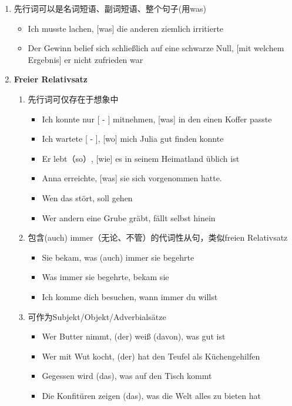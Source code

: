 \documentclass[UTF8]{report}
\begin{document}
\begin{enumerate}
    \item 先行词可以是名词短语、副词短语、整个句子(用was)
    \begin{itemize}
        \item Ich musste lachen, [was] die anderen ziemlich irritierte
        \item Der Gewinn belief sich schließlich auf eine schwarze Null, [mit welchem Ergebnis] er nicht zufrieden war
    \end{itemize}
    \item \textbf{Freier Relativsatz}
    \begin{enumerate}
        \item 先行词可仅存在于想象中
        \begin{itemize}
            \item Ich konnte nur [ - ] mitnehmen, [was] in den einen Koffer passte
            \item Ich wartete [ - ], [wo] mich Julia gut finden konnte
            \item Er lebt（so）, [wie] es in seinem Heimatland üblich ist
            \item Anna erreichte, [was] sie sich vorgenommen hatte.
            \item Wen das stört, soll gehen
            \item Wer andern eine Grube gräbt, fällt selbst hinein
        \end{itemize}
        \item 包含(auch) immer（无论、不管）的代词性从句，类似freien Relativsatz
        \begin{itemize}
            \item Sie bekam, was (auch) immer sie begehrte
            \item Was immer sie begehrte, bekam sie
            \item Ich komme dich besuchen, wann immer du willst
        \end{itemize}
        \item 可作为Subjekt/Objekt/Adverbialsätze
        \begin{itemize}
            \item Wer Butter nimmt, (der) weiß (davon), was gut ist
            \item Wer mit Wut kocht, (der) hat den Teufel als Küchengehilfen
            \item Gegessen wird (das), was auf den Tisch kommt
            \item Die Konfitüren zeigen (das), was die Welt alles zu bieten hat

\end{itemize}
\end{enumerate}
\end{enumerate}
\end{document}
